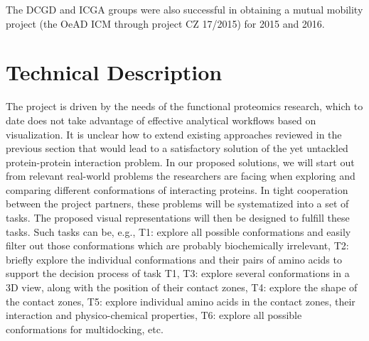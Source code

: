 \documentclass[11pt,a4paper,titlepage,oneside,onecolumn]{article}
\begin{document}
The DCGD and ICGA groups were also successful in obtaining a mutual mobility project (the OeAD ICM through project CZ 17/2015) for 2015 and 2016.

\section{Technical Description}
\label{sec:TechnicalDescription}
The project is driven by the needs of the functional proteomics research, which to date does not take advantage of effective analytical workflows based on visualization.
It is unclear how to extend existing approaches reviewed in the previous section that would lead to a satisfactory solution of the yet untackled protein-protein interaction problem.
In our proposed solutions, we will start out from relevant real-world problems the researchers are facing when exploring and comparing different conformations of interacting proteins.
In tight cooperation between the project partners, these problems will be systematized into a set of tasks. 
The proposed visual representations will then be designed to fulfill these tasks.
Such tasks can be, e.g., T1: explore all possible conformations and easily filter out those conformations which are probably biochemically irrelevant, T2: briefly explore the individual conformations and their pairs of amino acids to support the decision process of task T1, T3: explore several conformations in a 3D view, along with the position of their contact zones, T4: explore the shape of the contact zones, T5: explore individual amino acids in the contact zones, their interaction and physico-chemical properties, T6: explore all possible conformations for multidocking, etc.
\end{document}
